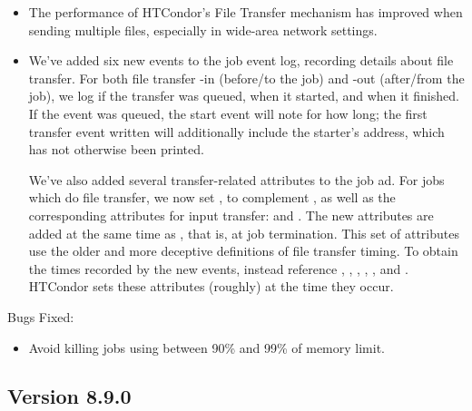 \begin{itemize}

\item The performance of HTCondor's File Transfer mechanism has improved when
	sending multiple files, especially in wide-area network settings.

\item We've added six new events to the job event log, recording details
about file transfer.  For both file transfer -in (before/to the job) and
-out (after/from the job), we log if the transfer was queued, when it started,
and when it finished.  If the event was queued, the start event will note
for how long; the first transfer event written will additionally include
the starter's address, which has not otherwise been printed.

We've also added several transfer-related attributes to the job ad.  For jobs
which do file transfer, we now set
, to complement
, as well as the corresponding
attributes for input transfer:
 and
.  The new attributes are added at
the same time as , that is, at
job termination.  This set of attributes use the older and more deceptive
definitions of file transfer timing.  To obtain the times recorded by the
new events, instead reference ,
, ,
, , and
.  HTCondor sets these attributes (roughly) at
the time they occur.


\end{itemize}

\noindent Bugs Fixed:

\begin{itemize}

\item Avoid killing jobs using between 90\% and 99\% of memory limit. 

\end{itemize}

\subsection*{\label{sec:New-8-9-0}Version 8.9.0}

